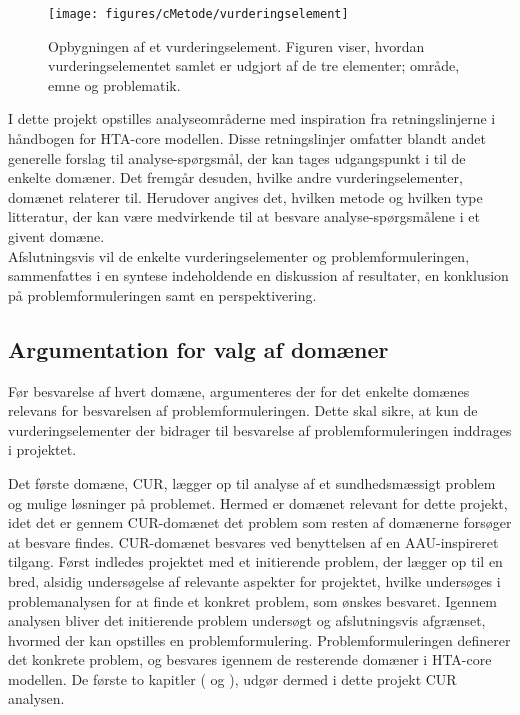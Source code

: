 \begin{figure}[H] 
\begin{center}
\texttt{[image: figures/cMetode/vurderingselement]}
\end{center}
\caption{Opbygningen af et vurderingselement. Figuren viser, hvordan vurderingselementet samlet er udgjort af de tre elementer; område, emne og problematik.}
\label{fig:vurderingselement} 
\end{figure}

I dette projekt opstilles analyseområderne med inspiration fra retningslinjerne i håndbogen for HTA-core modellen. Disse retningslinjer omfatter blandt andet generelle forslag til analyse-spørgsmål, der kan tages udgangspunkt i til de enkelte domæner. Det fremgår desuden, hvilke andre vurderingselementer, domænet relaterer til. Herudover angives det, hvilken metode og hvilken type litteratur, der kan være medvirkende til at besvare analyse-spørgsmålene i et givent domæne. \citep{HTAcore} \\
Afslutningsvis vil de enkelte vurderingselementer og problemformuleringen, sammenfattes i en syntese indeholdende en diskussion af resultater, en konklusion på problemformuleringen samt en perspektivering. 

\subsection{Argumentation for valg af domæner}
Før besvarelse af hvert domæne, argumenteres der for det enkelte domænes relevans for besvarelsen af problemformuleringen. Dette skal sikre, at kun de vurderingselementer der bidrager til besvarelse af problemformuleringen inddrages i projektet. 

Det første domæne, CUR, lægger op til analyse af et sundhedsmæssigt problem og mulige løsninger på problemet. Hermed er domænet relevant for dette projekt, idet det er gennem CUR-domænet det problem som resten af domænerne forsøger at besvare findes. CUR-domænet besvares ved benyttelsen af en AAU-inspireret tilgang. Først indledes projektet med et initierende problem, der lægger op til en bred, alsidig undersøgelse af relevante aspekter for projektet, hvilke undersøges i problemanalysen for at finde et konkret problem, som ønskes besvaret. Igennem analysen bliver det initierende problem undersøgt og afslutningsvis afgrænset, hvormed der kan opstilles en problemformulering. Problemformuleringen definerer det konkrete problem, og besvares igennem de resterende domæner i HTA-core modellen. De første to kapitler ( og ), udgør dermed i dette projekt CUR analysen. 

